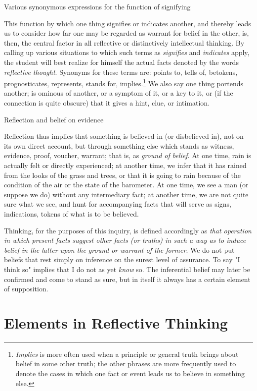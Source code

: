 \documentclass[letterpaper]{book}
\begin{document}
Various synonymous expressions for the function of signifying

This function by which one thing signifies or indicates another, and
thereby leads us to consider how far one may be regarded as warrant for
belief in the other, is, then, the central factor in all reflective or
distinctively intellectual thinking. By calling up various situations to
which such terms as \emph{signifies} and \emph{indicates} apply, the
student will best realize for himself the actual facts denoted by the
words \emph{reflective thought}. Synonyms for these terms are: points
to, tells of, betokens, prognosticates, represents, stands for,
implies.\footnote{
\emph{Implies} is more often used when a principle or general truth
brings about belief in some other truth; the other phrases are more
frequently used to denote the cases in which one fact or event leads us
to believe in something else.}
We also say one thing portends another; is ominous of another, or a
symptom of it, or a key to it, or (if the connection is quite obscure)
that it gives a hint, clue, or intimation.

Reflection and belief on evidence

Reflection thus implies that something is believed in (or disbelieved
in), not on its own direct account, but through something else which
stands as witness, evidence, proof, voucher, warrant; that is, as
\emph{ground of belief}. At one time, rain is actually felt or directly
experienced; at another time, we infer that it has rained from the looks
of the grass and trees, or that it is going to rain because of the
condition of the air or the state of the barometer. At one time, we see
a man (or suppose we do) without any intermediary fact; at another time,
we are not quite sure what we see, and hunt for accompanying facts that
will serve as signs, indications, tokens of what is to be believed.

Thinking, for the purposes of this inquiry, is defined accordingly as
\emph{that operation in which present facts suggest other facts (or
truths) in such a way as to induce
belief
in the latter upon the ground or warrant of the former}. We do not put
beliefs that rest simply on inference on the surest level of assurance.
To say "I think so" implies that I do not as yet \emph{know} so. The
inferential belief may later be confirmed and come to stand as sure, but
in itself it always has a certain element of supposition.

\section{Elements in Reflective Thinking}
\end{document}
